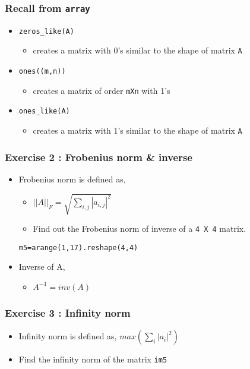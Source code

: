 \documentclass[17pt,compress]{beamer}
\begin{document}
\begin{frame}
\frametitle{Recall from \texttt{array}}
\label{sec-5.2}

\begin{itemize}
\item \texttt{zeros\_like(A)}
	\begin{itemize}
	\item creates a matrix with 0's similar to the shape of matrix \texttt{A}\pause
	\end{itemize}
\item \texttt{ones((m,n))}
	\begin{itemize}
	\item creates a matrix of order \texttt{mXn} with 1's\pause
	\end{itemize}
\item \texttt{ones\_like(A)}
	\begin{itemize}
	\item creates a matrix with 1's similar to the shape of matrix \texttt{A}
	\end{itemize}
\end{itemize}
\end{frame}
\begin{frame}[fragile]
\frametitle{Exercise 2 : Frobenius norm \& inverse}
\label{sec-6}
\begin{itemize}
\item Frobenius norm is defined as,
	\begin{itemize}
	\item $||A||_F = \sqrt{\sum_{i,j}|a_{i,j}|^2}$\pause
	\end{itemize}
\begin{itemize}
\item Find out the Frobenius norm of inverse of a \texttt{4 X 4} matrix.
\end{itemize}
\texttt{m5=arange(1,17).reshape(4,4)}\pause
\item Inverse of A,
	\begin{itemize}
	\item $A^{-1} = inv(A)$
	\end{itemize}
\end{itemize}
\end{frame}
\begin{frame}[fragile]
\frametitle{Exercise 3 : Infinity norm}
\label{sec-7}
\begin{itemize}
\item Infinity norm is defined as,
       $max(\sum_{i} |a_{i}|^2)$
\end{itemize}\pause
\begin{itemize}
\item Find the infinity norm of the matrix \texttt{im5}
\end{itemize}

\end{frame}
\end{document}
